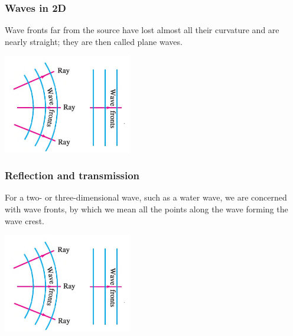 \documentclass[]{beamer}
\begin{document}
  
  \begin{frame}
  \frametitle{Waves in 2D }
  
  
  
  
  Wave fronts far from the source have lost almost all their
  curvature  and are nearly straight; they are
  then called plane waves.
  
  
    \begin{center}
    \includegraphics[height=1.7in]{images4/13.jpg}
  \end{center}
  
    \end{frame}







\begin{frame}
  \frametitle{Reflection and transmission }
  
  
  
  
  For a two- or three-dimensional wave, such as a water wave, we are concerned
  with wave fronts, by which we mean all the points along the wave forming the
  wave crest.
  
  
  
    \begin{center}
    \includegraphics[height=1.7in]{images4/13.jpg}
  \end{center}
  
    \end{frame}
  
  
  
\end{document}
